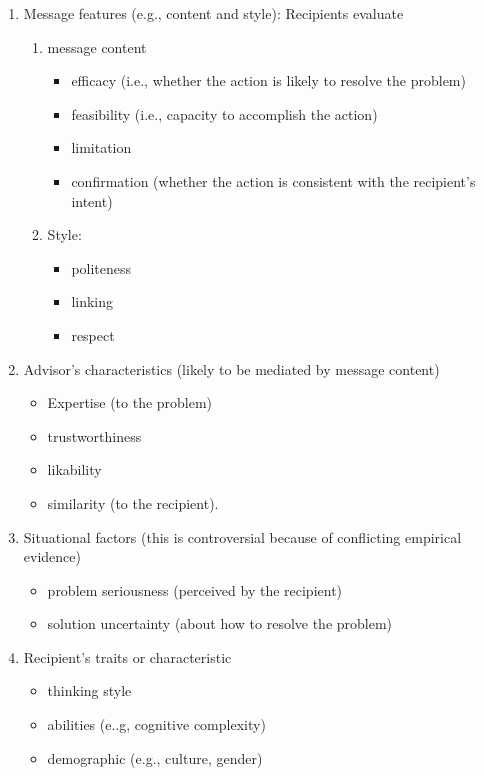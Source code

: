 \documentclass[
]{book}
\providecommand{\tightlist}{%
  \setlength{\itemsep}{0pt}\setlength{\parskip}{0pt}}
\begin{document}
\begin{enumerate}
\def\labelenumi{\arabic{enumi}.}
\item
  Message features (e.g., content and style): Recipients evaluate

  \begin{enumerate}
  \def\labelenumii{\arabic{enumii}.}
  \item
    message content

    \begin{itemize}
    \tightlist
    \item
      efficacy (i.e., whether the action is likely to resolve the problem)
    \item
      feasibility (i.e., capacity to accomplish the action)
    \item
      limitation
    \item
      confirmation (whether the action is consistent with the recipient's intent)
    \end{itemize}
  \item
    Style:

    \begin{itemize}
    \tightlist
    \item
      politeness
    \item
      linking
    \item
      respect
    \end{itemize}
  \end{enumerate}
\item
  Advisor's characteristics (likely to be mediated by message content)

  \begin{itemize}
  \tightlist
  \item
    Expertise (to the problem)
  \item
    trustworthiness
  \item
    likability
  \item
    similarity (to the recipient).
  \end{itemize}
\item
  Situational factors (this is controversial because of conflicting empirical evidence)

  \begin{itemize}
  \tightlist
  \item
    problem seriousness (perceived by the recipient)
  \item
    solution uncertainty (about how to resolve the problem)
  \end{itemize}
\item
  Recipient's traits or characteristic

  \begin{itemize}
  \tightlist
  \item
    thinking style
  \item
    abilities (e..g, cognitive complexity)
  \item
    demographic (e.g., culture, gender)
  \end{itemize}
\end{enumerate}
\end{document}
